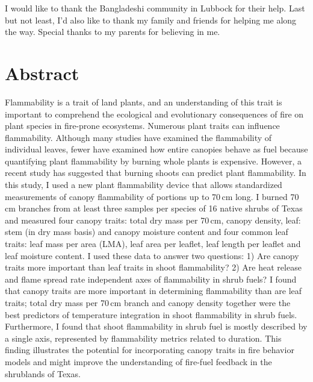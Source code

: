 \documentclass{ttuthes2007}
\begin{document}
I would like to thank the Bangladeshi community in Lubbock for their help. Last but not least, I'd  also like to thank my family and friends for helping me along the way. Special thanks to my parents for believing in me. 
\newpage
\begin{singlespace}
\tableofcontents
\end{singlespace}
\chapter{\textbf{Abstract}}
Flammability is a trait of land plants, and an understanding of this trait is important to comprehend the ecological and evolutionary consequences of fire on plant species in fire-prone ecosystems. Numerous plant traits can influence flammability. Although many studies have examined the flammability of individual leaves, fewer have examined how entire canopies behave as fuel because quantifying plant flammability by burning whole plants is expensive. However, a recent study has suggested that burning shoots can predict plant flammability. %
In this study, I used a new plant flammability device that allows standardized measurements of canopy flammability of portions up to 70\,cm long. %
 I burned 70\,cm branches from at least three samples per species of 16 native shrubs of Texas and measured four canopy traits: total dry mass per 70\,cm, canopy density, leaf: stem (in dry mass basis) and canopy moisture content and four common leaf traits: leaf mass per area (LMA), leaf area per leaflet, leaf length per leaflet and leaf moisture content. I used these data to answer two questions: 1) Are canopy traits more important than leaf traits in shoot flammability? 2) Are heat release and flame spread rate independent axes of flammability in shrub fuels? I found that canopy traits are more important in determining flammability than are leaf traits; total dry mass per 70\,cm branch and canopy density together were the best predictors of temperature integration in shoot flammability in shrub fuels. Furthermore, I found that shoot flammability in shrub fuel is mostly described by a single axis, represented by flammability metrics related to duration. This finding illustrates the potential for incorporating canopy traits in fire behavior models and might improve the understanding of fire-fuel feedback in the shrublands of Texas.
 
\end{document}
